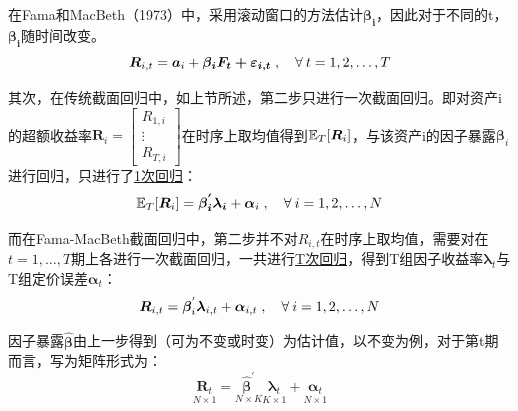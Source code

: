 \documentclass[11pt]{article}
\begin{document}
在Fama和MacBeth（1973）中，采用滚动窗口的方法估计$\bm{\beta_i}$，因此对于不同的t，$\bm{\beta_i}$随时间改变。
\begin{equation*}
    \bm{R}_{i,t} = \bm{a}_i + \bm{\beta_{i} \bm{F}_t + \bm{\varepsilon}_{i,t}} \inlinesep \forall t=1,2,\dots,T
\end{equation*}

其次，在传统截面回归中，如上节所述，第二步只进行一次截面回归。即对资产i的超额收益率$\bm{R}_i = \begin{bmatrix} R_{1,i} \\ \vdots \\ R_{T,i} \end{bmatrix}$在时序上取均值得到$\mathbb{E}_T[\bm{R}_i]$，与该资产i的因子暴露$\bm{\beta}_i$进行回归，只进行了\uline{1次回归}：
\begin{equation*}
    \E_T[\bm{R}_i] = \bm{\beta_{i}^{'} \lambda_i} + \bm{\alpha}_i \inlinesep \forall i=1,2,\dots,N
\end{equation*}

而在Fama-MacBeth截面回归中，第二步并不对$R_{i,t}$在时序上取均值，需要对在$t=1,\dots,T$期上各进行一次截面回归，一共进行\uline{T次回归}，得到T组因子收益率$\bm{\lambda}_t$与T组定价误差$\bm{\alpha}_t$：
\begin{equation*}
    \bm{R}_{i,t} = \bm{\beta}_{i}^{'} \bm{\lambda}_{i,t} + \bm{\alpha}_{i,t} \inlinesep \forall i=1,2,\dots,N
\end{equation*}

因子暴露$\hat{\bm{\beta}}$由上一步得到（可为不变或时变）为估计值，以不变为例，对于第t期而言，写为矩阵形式为：
\begin{equation*}
    \underset{N \times 1}{\bm{R}_t} = \underset{N \times K}{\hat{\bm{\beta}}^{'}} \underset{ K \times 1}{\bm{\lambda}_t}  + \underset{N \times 1}{\bm{\alpha}_t}
\end{equation*}
\end{document}
